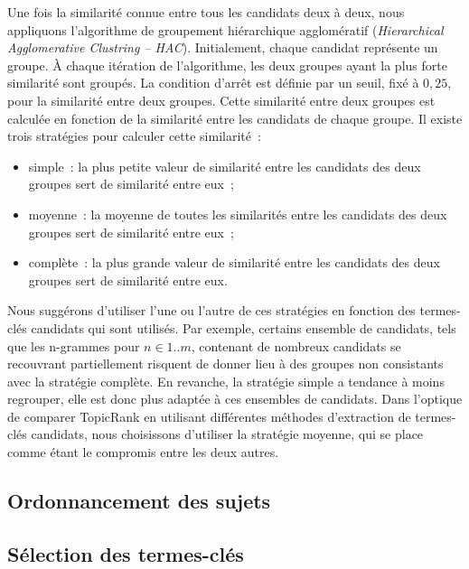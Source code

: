     Une fois la similarité connue entre tous les candidats deux à deux, nous
    appliquons l'algorithme de groupement hiérarchique agglomératif
    (\textit{Hierarchical Agglomerative Clustring -- HAC}). Initialement, chaque
    candidat représente un groupe. À chaque itération de l'algorithme, les deux
    groupes ayant la plus forte similarité sont groupés. La condition d'arrêt
    est définie par un seuil, fixé à $0,25$, pour la similarité entre deux
    groupes. Cette similarité entre deux groupes est calculée en fonction de la
    similarité entre les candidats de chaque groupe. Il existe trois stratégies
    pour calculer cette similarité~:
    \begin{itemize}
      \item{simple~: la plus petite valeur de similarité entre les candidats
            des deux groupes sert de similarité entre eux~;}
      \item{moyenne~: la moyenne de toutes les similarités entre les
            candidats des deux groupes sert de similarité entre eux~;}
      \item{complète~: la plus grande valeur de similarité entre les candidats
            des deux groupes sert de similarité entre eux.}
    \end{itemize}
    Nous suggérons d'utiliser l'une ou l'autre de ces stratégies en fonction des
    termes-clés candidats qui sont utilisés. Par exemple, certains ensemble de
    candidats, tels que les n-grammes pour $n \in 1..m$,
    contenant de nombreux candidats se recouvrant partiellement risquent de
    donner lieu à des groupes non consistants avec la stratégie complète. En
    revanche, la stratégie simple a tendance à moins regrouper, elle est donc
    plus adaptée à ces ensembles de candidats. Dans l'optique de comparer
    TopicRank en utilisant différentes méthodes d'extraction de termes-clés
    candidats, nous choisissons d'utiliser la stratégie moyenne, qui se place
    comme étant le compromis entre les deux autres.

  \subsection{Ordonnancement des sujets}
  \label{subsec:ordonnancement_des_sujets}



  \subsection{Sélection des termes-clés}
  \label{subsec:selection_des_termes_cles}


